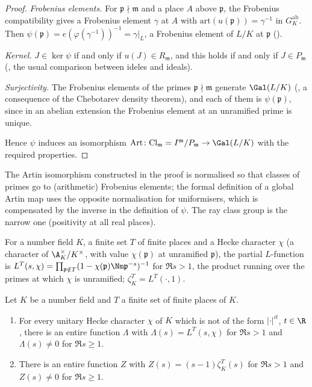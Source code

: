 \begin{proof}
\emph{Frobenius elements.} For $\mathfrak p\nmid\mathfrak m$ and a place $A$ above $\mathfrak p$, the Frobenius compatibility gives a Frobenius element
$\gamma$ at $A$ with $\mathrm{art}(u(\mathfrak p))=\gamma^{-1}$ in $G_K^{\mathrm{ab}}$. Then $\psi(\mathfrak p)=e(\varphi(\gamma^{-1}))^{-1}=\gamma|_L$, a Frobenius
element of $L/K$ at $\mathfrak p$ ().

\emph{Kernel.} $J\in\ker\psi$ if and only if $u(J)\in R_{\mathfrak m}$, and this holds if and only if $J\in P_{\mathfrak m}$
(, the usual comparison between ideles and ideals).

\emph{Surjectivity.} The Frobenius elements of the primes $\mathfrak p\nmid\mathfrak m$ generate $\Gal(L/K)$
(, a consequence of the Chebotarev density theorem), and each of them is
$\psi(\mathfrak p)$, since in an abelian extension the Frobenius element at an unramified prime is unique.

Hence $\psi$ induces an isomorphism $\mathrm{Art}\colon\mathrm{Cl}_{\mathfrak m}=I^{\mathfrak m}/P_{\mathfrak m}\to\Gal(L/K)$ with the required properties.
\end{proof}

\begin{remark}\label{pf:sh-misc:rayrem}
The Artin isomorphism constructed in the proof is normalised so that classes of primes go to (arithmetic) Frobenius elements; the
formal definition of a global Artin map uses the opposite normalisation for uniformisers, which is compensated by the inverse in the
definition of $\psi$. The ray class group is the narrow one (positivity at all real places).
\end{remark}

For a number field $K$, a finite set $T$ of finite places and a Hecke character $\chi$ (a character of $\A_K^\times/K^\times$, with value
$\chi(\mathfrak p)$ at unramified $\mathfrak p$), the partial $L$-function is $L^T(s,\chi)=\prod_{\mathfrak p\notin T}(1-\chi(\mathfrak p)\Nm\mathfrak p^{-s})^{-1}$
for $\Re s>1$, the product running over the primes at which $\chi$ is unramified; $\zeta_K^T=L^T(\cdot,1)$.

\begin{theorem}\label{pf:sh-misc:heckeL}
Let $K$ be a number field and $T$ a finite set of finite places of $K$.
\begin{enumerate}[label=(\roman*)]
\item For every unitary Hecke character $\chi$ of $K$ which is not of the form $|\cdot|^{it}$, $t\in\R$, there is an entire function $\Lambda$
with $\Lambda(s)=L^T(s,\chi)$ for $\Re s>1$ and $\Lambda(s)\ne0$ for $\Re s\ge1$.
\item There is an entire function $Z$ with $Z(s)=(s-1)\zeta_K^T(s)$ for $\Re s>1$ and $Z(s)\ne0$ for $\Re s\ge1$.
\end{enumerate}
\end{theorem}

